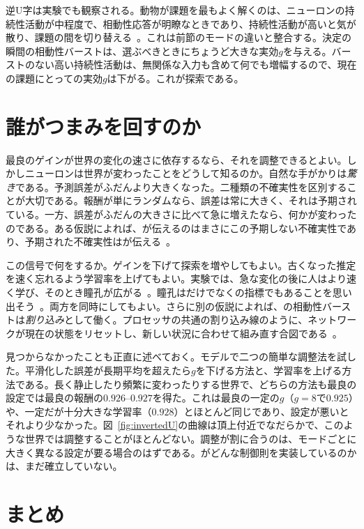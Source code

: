 逆U字は実験でも観察される。動物が課題を最もよく解くのは、ニューロンの持続性活動が中程度で、相動性応答が明瞭なときであり、持続性活動が高いと気が散り、課題の間を切り替える~\cite{AstonJones2005}。これは前節のモードの違いと整合する。決定の瞬間の相動性バーストは、選ぶべきときにちょうど大きな実効$g$を与える。バーストのない高い持続性活動は、無関係な入力も含めて何でも増幅するので、現在の課題にとっての実効$g$は下がる。これが探索である。

\section{誰がつまみを回すのか}

最良のゲインが世界の変化の速さに依存するなら、それを調整できるとよい。しかしニューロンは世界が変わったことをどうして知るのか。自然な手がかりは\emph{驚き}である。予測誤差がふだんより大きくなった。二種類の不確実性を区別することが大切である。報酬が単にランダムなら、誤差は常に大きく、それは予期されている。一方、誤差がふだんの大きさに比べて急に増えたなら、何かが変わったのである。ある仮説によれば、が伝えるのはまさにこの予期しない不確実性であり、予期された不確実性はが伝える~\cite{YuDayan2005}。

この信号で何をするか。ゲインを下げて探索を増やしてもよい。古くなった推定を速く忘れるよう学習率を上げてもよい。実験では、急な変化の後に人はより速く学び、そのとき瞳孔が広がる~\cite{Nassar2012}。瞳孔はだけでなくの指標でもあることを思い出そう~\cite{Reimer2016}。両方を同時にしてもよい。さらに別の仮説によれば、の相動性バーストは\emph{割り込み}として働く。プロセッサの共通の割り込み線のように、ネットワークが現在の状態をリセットし、新しい状況に合わせて組み直す合図である~\cite{BouretSara2005}。

見つからなかったことも正直に述べておく。モデルで二つの簡単な調整法を試した。平滑化した誤差が長期平均を超えたら$g$を下げる方法と、学習率を上げる方法である。長く静止したり頻繁に変わったりする世界で、どちらの方法も最良の設定では最良の報酬の$0.926$--$0.927$を得た。これは最良の一定の$g$（$g=8$で$0.925$）や、一定だが十分大きな学習率（$0.928$）とほとんど同じであり、設定が悪いとそれより少なかった。図~\ref{fig:invertedU}の曲線は頂上付近でなだらかで、このような世界では調整することがほとんどない。調整が割に合うのは、モードごとに大きく異なる設定が要る場合のはずである。がどんな制御則を実装しているのかは、まだ確立していない。

\section{まとめ}

